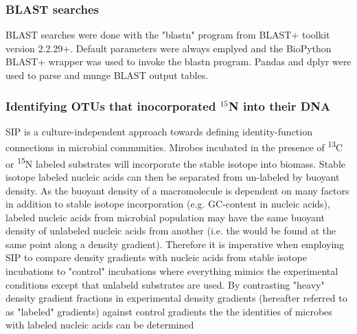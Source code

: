 \subsubsection{BLAST searches}
BLAST searches were done with the "blastn" program from BLAST+ toolkit \cite{20003500} version 2.2.29+. Default parameters were always emplyed and the BioPython \cite{19304878} BLAST+ wrapper was used to invoke the blastn program. Pandas \cite{citeulike:11241428} and dplyr \cite{dplyr} were used to parse and munge BLAST output tables.  

\subsubsection{Identifying OTUs that inocorporated $^{15}$N into their DNA}
SIP is a culture-independent approach towards defining identity-function connections in microbial communities. Mirobes incubated in the presence of \textsuperscript{13}C or \textsuperscript{15}N labeled substrates will incorporate the stable isotope into biomass. Stable isotope labeled nucleic acids can then be separated from un-labeled by buoyant density. As the buoyant density of a macromolecule is dependent on many factors in addition to stable isotope incorporation (e.g. GC-content in nucleic acids), labeled nucleic acids from microbial population may have the same buoyant density of unlabeled nucleic acids from another (i.e. the would be found at the same point along a density gradient). Therefore it is imperative when employing SIP to compare density gradients with nucleic acids from stable isotope incubations to "control" incubations where everything mimics the experimental conditions except that unlabeld substrates are used. By contrasting "heavy" density gradient fractions in experimental density gradients (hereafter referred to as "labeled" gradients) against control gradients the the identities of microbes with labeled nucleic acids can be determined 

